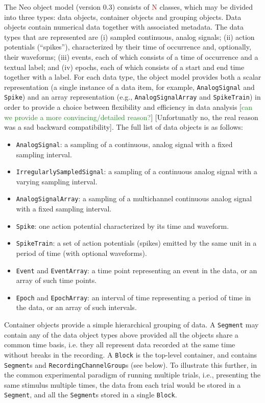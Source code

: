 \documentclass{frontiers}
\newcommand{\missing}[1]{\textcolor{red}{#1}}
\newcommand{\andrew}[1]{[\textcolor{ForestGreen}{#1}]}
\newcommand{\samuel}[1]{[\textcolor{RubineRed}{#1}]}
\begin{document}
The Neo object model (version 0.3) consists of \missing{N} classes, which may be divided into three types: data objects, container objects and grouping objects.
Data objects contain numerical data together with associated metadata.
The data types that are represented are 
(i) sampled continuous, analog signals; 
(ii) action potentials (``spikes''), characterized by their time of occurrence and, optionally, their waveforms; 
(iii) events, each of which consists of a time of occurrence and a textual label; and 
(iv) epochs, each of which consists of a start and end time together with a label.
For each data type, the object model provides both a scalar representation (a single instance of a data item, for example, \lstinline`AnalogSignal` and \lstinline`Spike`) and an array representation (e.g., \lstinline`AnalogSignalArray` and \lstinline`SpikeTrain`) in order to provide a choice between flexibility and efficiency in data analysis \andrew{can we provide a more convincing/detailed reason?} \samuel{Unfortunatly no, the real reason was a sad backward compatibility}.
The full list of data objects is as follows:

\begin{itemize}
\item \lstinline`AnalogSignal`: a sampling of a continuous, analog signal with a fixed sampling interval.
\item \lstinline`IrregularlySampledSignal`: a sampling of a continuous analog signal with a varying sampling interval.
\item \lstinline`AnalogSignalArray`: a sampling of a multichannel continuous analog signal with a fixed sampling interval.
\item \lstinline`Spike`: one action potential characterized by its time and waveform.
\item \lstinline`SpikeTrain`: a set of action potentials (spikes) emitted by the same unit in a period of time (with optional waveforms).
\item \lstinline`Event` and \lstinline`EventArray`: a time point representing an event in the data, or an array of such time points.
\item \lstinline`Epoch` and \lstinline`EpochArray`: an interval of time representing a period of time in the data, or an array of such intervals.
\end{itemize}

Container objects provide a simple hierarchical grouping of data. 
A \lstinline`Segment` may contain any of the data object types above provided all the objects share a common time basis, i.e. they all represent data recorded at the same time without breaks in the recording. 
A \lstinline`Block` is the top-level container, and contains \lstinline`Segment`s and \lstinline`RecordingChannelGroup`s (see below).
To illustrate this further, in the common experimental paradigm of running multiple trials, i.e., presenting the same stimulus multiple times, the data from each trial would be stored in a \lstinline`Segment`, and all the \lstinline`Segment`s stored in a single \lstinline`Block`. 
\end{document}
